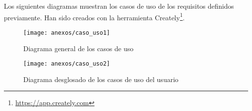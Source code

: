 Los siguientes diagramas muestran los casos de uso de los requisitos definidos previamente. Han sido creados con la herramienta Creately\footnote{\url{https://app.creately.com}}.

\FloatBarrier
\begin{figure}[!h]
\centering
\texttt{[image: anexos/caso\_uso1]}
\caption[Diagrama general de los casos de uso]{Diagrama general de los casos de uso}
\label{fig:caso}
\end{figure}
\FloatBarrier

\FloatBarrier
\begin{figure}[!h]
\centering
\texttt{[image: anexos/caso\_uso2]}
\caption[Diagrama desglosado de los casos de uso del usuario]{Diagrama desglosado de los casos de uso del usuario}
\label{fig:caso}
\end{figure}
\FloatBarrier


